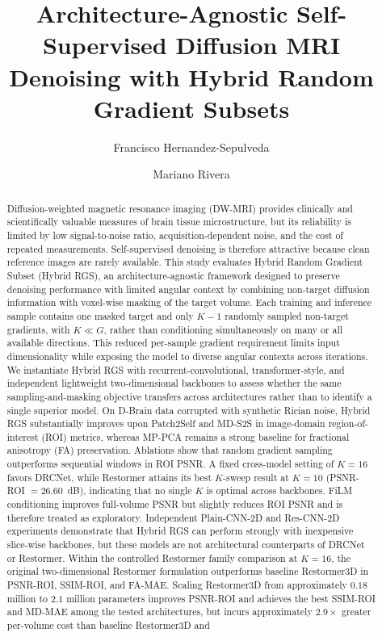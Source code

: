 \documentclass[preprint,12pt]{elsarticle}
\begin{document}
\begin{frontmatter}

  \title{Architecture-Agnostic Self-Supervised Diffusion MRI Denoising with Hybrid Random Gradient Subsets}

  \author[inst1]{Francisco Hernandez-Sepulveda}

  \author[inst1]{Mariano Rivera}

  \address[inst1]{Centro de Investigacion en Matematicas, Guanajuato, Mexico}

  \begin{abstract}
    Diffusion-weighted magnetic resonance imaging (DW-MRI) provides clinically and scientifically valuable measures of brain tissue microstructure, but its reliability is limited by low signal-to-noise ratio, acquisition-dependent noise, and the cost of repeated measurements. Self-supervised denoising is therefore attractive because clean reference images are rarely available. This study evaluates Hybrid Random Gradient Subset (Hybrid RGS), an architecture-agnostic framework designed to preserve denoising performance with limited angular context by combining non-target diffusion information with voxel-wise masking of the target volume. Each training and inference sample contains one masked target and only $K-1$ randomly sampled non-target gradients, with $K\ll G$, rather than conditioning simultaneously on many or all available directions. This reduced per-sample gradient requirement limits input dimensionality while exposing the model to diverse angular contexts across iterations. We instantiate Hybrid RGS with recurrent-convolutional, transformer-style, and independent lightweight two-dimensional backbones to assess whether the same sampling-and-masking objective transfers across architectures rather than to identify a single superior model. On D-Brain data corrupted with synthetic Rician noise, Hybrid RGS substantially improves upon Patch2Self and MD-S2S in image-domain region-of-interest (ROI) metrics, whereas MP-PCA remains a strong baseline for fractional anisotropy (FA) preservation. Ablations show that random gradient sampling outperforms sequential windows in ROI PSNR. A fixed cross-model setting of $K=16$ favors DRCNet, while Restormer attains its best $K$-sweep result at $K=10$ (PSNR-ROI $=26.60$~dB), indicating that no single $K$ is optimal across backbones. FiLM conditioning improves full-volume PSNR but slightly reduces ROI PSNR and is therefore treated as exploratory. Independent Plain-CNN-2D and Res-CNN-2D experiments demonstrate that Hybrid RGS can perform strongly with inexpensive slice-wise backbones, but these models are not architectural counterparts of DRCNet or Restormer. Within the controlled Restormer family comparison at $K=16$, the original two-dimensional Restormer formulation outperforms baseline Restormer3D in PSNR-ROI, SSIM-ROI, and FA-MAE. Scaling Restormer3D from approximately $0.18$ million to $2.1$ million parameters improves PSNR-ROI and achieves the best SSIM-ROI and MD-MAE among the tested architectures, but incurs approximately $2.9\times$ greater per-volume cost than baseline Restormer3D and 
\end{abstract}
\end{frontmatter}
\end{document}

